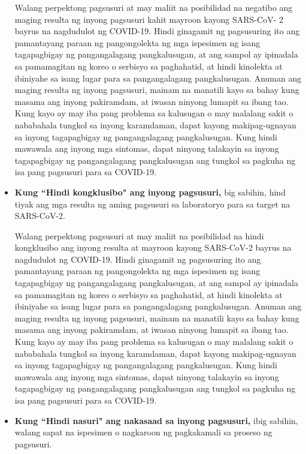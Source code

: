 \documentclass[10pt]{article}
\begin{document}
\begin{itemize}
{  Walang perpektong pagsusuri at may maliit na posibilidad na negatibo ang
  maging resulta ng inyong pagsusuri kahit mayroon kayong SARS-CoV- 2 bayrus na
  nagdudulot ng COVID-19. Hindi ginagamit ng pagsusuring ito ang pamantayang
  paraan ng pangongolekta ng mga ispesimen ng isang tagapagbigay ng
  pangangalagang pangkalusugan, at ang sampol ay ipinadala sa pamamagitan ng
  koreo o serbisyo sa paghahatid, at hindi kinolekta at ibiniyahe sa isang lugar
  para sa pangangalagang pangkalusugan. Anuman ang maging resulta ng inyong
  pagsusuri, mainam na manatili kayo sa bahay kung masama ang inyong pakiramdam,
  at iwasan ninyong lumapit sa ibang tao. Kung kayo ay may iba pang problema sa
  kalusugan o may malalang sakit o nababahala tungkol sa inyong karamdaman,
  dapat kayong makipag-ugnayan sa inyong tagapagbigay ng pangangalagang
  pangkalusugan. Kung hindi mawawala ang inyong mga sintomas, dapat ninyong
  talakayin sa inyong tagapagbigay ng pangangalagang pangkalusugan ang tungkol
  sa pagkuha ng isa pang pagsusuri para sa COVID-19.
}

\item

  \textbf{Kung ``Hindi kongklusibo" ang inyong pagsusuri,} big sabihin, hind
  tiyak ang mga resulta ng aming pagsusuri sa laboratoryo para sa target na
  SARS-CoV-2.

  Walang perpektong pagsusuri at may maliit na posibilidad na hindi kongklusibo
  ang inyong resulta at mayroon kayong SARS-CoV-2 bayrus na nagdudulot ng
  COVID-19. Hindi ginagamit ng pagsusuring ito ang pamantayang paraan ng
  pangongolekta ng mga ispesimen ng isang tagapagbigay ng pangangalagang
  pangkalusugan, at ang sampol ay ipinadala sa pamamagitan ng koreo o serbisyo
  sa paghahatid, at hindi kinolekta at ibiniyahe sa isang lugar para sa
  pangangalagang pangkalusugan. Anuman ang maging resulta ng inyong pagsusuri,
  mainam na manatili kayo sa bahay kung masama ang inyong pakiramdam, at iwasan
  ninyong lumapit sa ibang tao. Kung kayo ay may iba pang problema sa kalusugan
  o may malalang sakit o nababahala tungkol sa inyong karamdaman, dapat kayong
  makipag-ugnayan sa inyong tagapagbigay ng pangangalagang pangkalusugan. Kung
  hindi mawawala ang inyong mga sintomas, dapat ninyong talakayin sa inyong
  tagapagbigay ng pangangalagang pangkalusugan ang tungkol sa pagkuha ng isa
  pang pagsusuri para sa COVID-19.

\item

  \textbf{Kung ``Hindi nasuri" ang nakasaad sa inyong pagsusuri,} ibig sabihin,
  walang sapat na ispesimen o nagkaroon ng pagkakamali sa proseso ng pagsusuri.


\end{itemize}
\end{document}
